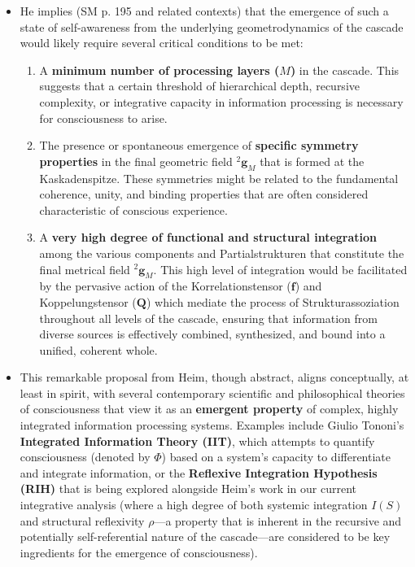 \documentclass[
    12pt,              %
    a4paper,           %
    headings=normal,   %
    twoside=true,      %
    BCOR=8mm,          %
]{scrbook}
\newcommand{\kompositionsfeld}{{}^2\mathbf{g}}
\newcommand{\korrelationstensor}{\mathbf{f}}
\newcommand{\koppelungstensor}{\mathbf{Q}}
\begin{document}
\begin{itemize}
    \item   He implies (SM p. 195 and related contexts) that the emergence of such a state of self-awareness from the underlying geometrodynamics of the cascade would likely require several critical conditions to be met:
        \begin{enumerate}[label=(\alph*)]
            \item  A \textbf{minimum number of processing layers (\(M\))} in the cascade. This suggests that a certain threshold of hierarchical depth, recursive complexity, or integrative capacity in information processing is necessary for consciousness to arise.
            \item  The presence or spontaneous emergence of \textbf{specific symmetry properties} in the final geometric field \(\kompositionsfeld_M\) that is formed at the Kaskadenspitze. These symmetries might be related to the fundamental coherence, unity, and binding properties that are often considered characteristic of conscious experience.
            \item  A \textbf{very high degree of functional and structural integration} among the various components and Partialstrukturen that constitute the final metrical field \(\kompositionsfeld_M\). This high level of integration would be facilitated by the pervasive action of the Korrelationstensor (\(\korrelationstensor\)) and Koppelungstensor (\(\koppelungstensor\)) which mediate the process of Strukturassoziation throughout all levels of the cascade, ensuring that information from diverse sources is effectively combined, synthesized, and bound into a unified, coherent whole.
        \end{enumerate}
    \item   This remarkable proposal from Heim, though abstract, aligns conceptually, at least in spirit, with several contemporary scientific and philosophical theories of consciousness that view it as an \textbf{emergent property} of complex, highly integrated information processing systems. Examples include Giulio Tononi’s \textbf{Integrated Information Theory (IIT)}, which attempts to quantify consciousness (denoted by \(\Phi\)) based on a system’s capacity to differentiate and integrate information, or the \textbf{Reflexive Integration Hypothesis (RIH)} that is being explored alongside Heim’s work in our current integrative analysis (where a high degree of both systemic integration \(I(S)\) and structural reflexivity \(\rho\)—a property that is inherent in the recursive and potentially self-referential nature of the cascade—are considered to be key ingredients for the emergence of consciousness).
\end{itemize}
\end{document}
